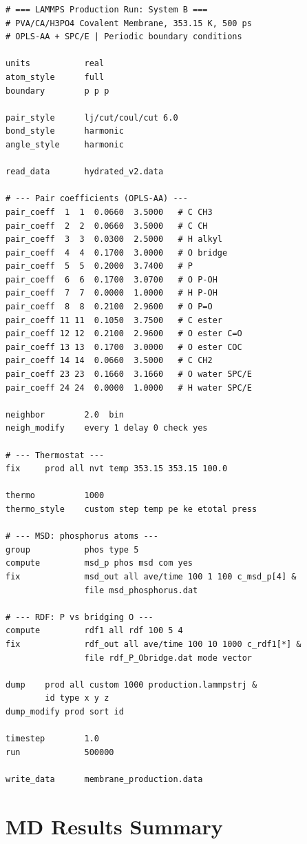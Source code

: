\documentclass[12pt,a4paper]{report}
\begin{document}
\begin{verbatim}
# === LAMMPS Production Run: System B ===
# PVA/CA/H3PO4 Covalent Membrane, 353.15 K, 500 ps
# OPLS-AA + SPC/E | Periodic boundary conditions

units           real
atom_style      full
boundary        p p p

pair_style      lj/cut/coul/cut 6.0
bond_style      harmonic
angle_style     harmonic

read_data       hydrated_v2.data

# --- Pair coefficients (OPLS-AA) ---
pair_coeff  1  1  0.0660  3.5000   # C CH3
pair_coeff  2  2  0.0660  3.5000   # C CH
pair_coeff  3  3  0.0300  2.5000   # H alkyl
pair_coeff  4  4  0.1700  3.0000   # O bridge
pair_coeff  5  5  0.2000  3.7400   # P
pair_coeff  6  6  0.1700  3.0700   # O P-OH
pair_coeff  7  7  0.0000  1.0000   # H P-OH
pair_coeff  8  8  0.2100  2.9600   # O P=O
pair_coeff 11 11  0.1050  3.7500   # C ester
pair_coeff 12 12  0.2100  2.9600   # O ester C=O
pair_coeff 13 13  0.1700  3.0000   # O ester COC
pair_coeff 14 14  0.0660  3.5000   # C CH2
pair_coeff 23 23  0.1660  3.1660   # O water SPC/E
pair_coeff 24 24  0.0000  1.0000   # H water SPC/E

neighbor        2.0  bin
neigh_modify    every 1 delay 0 check yes

# --- Thermostat ---
fix     prod all nvt temp 353.15 353.15 100.0

thermo          1000
thermo_style    custom step temp pe ke etotal press

# --- MSD: phosphorus atoms ---
group           phos type 5
compute         msd_p phos msd com yes
fix             msd_out all ave/time 100 1 100 c_msd_p[4] &
                file msd_phosphorus.dat

# --- RDF: P vs bridging O ---
compute         rdf1 all rdf 100 5 4
fix             rdf_out all ave/time 100 10 1000 c_rdf1[*] &
                file rdf_P_Obridge.dat mode vector

dump    prod all custom 1000 production.lammpstrj &
        id type x y z
dump_modify prod sort id

timestep        1.0
run             500000

write_data      membrane_production.data
\end{verbatim}

\section{MD Results Summary}
\end{document}
